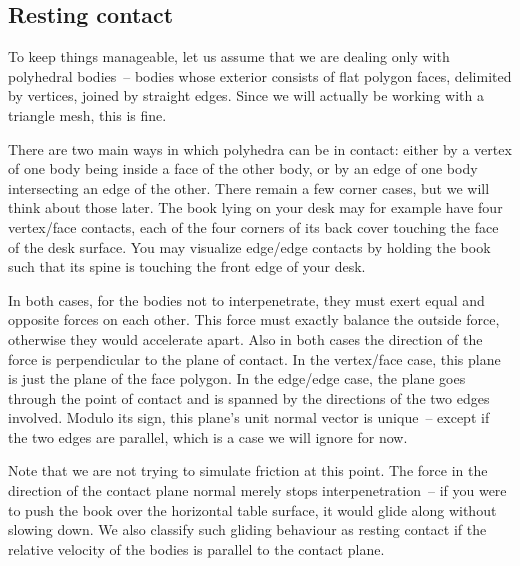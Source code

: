 \subsection{Resting contact\label{restingContact}}

To keep things manageable, let us assume that we are dealing only with polyhedral bodies~-- bodies
whose exterior consists of flat polygon faces, delimited by vertices, joined by straight edges.
Since we will actually be working with a triangle mesh, this is fine.

There are two main ways in which polyhedra can be in contact: either by a vertex of one body being
inside a face of the other body, or by an edge of one body intersecting an edge of the other.
There remain a few corner cases, but we will think about those later. The book lying on your desk
may for example have four vertex/face contacts, each of the four corners of its back cover
touching the face of the desk surface. You may visualize edge/edge contacts by holding the book
such that its spine is touching the front edge of your desk.

In both cases, for the bodies not to interpenetrate, they must exert equal and opposite forces on
each other. This force must exactly balance the outside force, otherwise they would accelerate
apart. Also in both cases the direction of the force is perpendicular to the plane of contact. In
the vertex/face case, this plane is just the plane of the face polygon. In the edge/edge case, the
plane goes through the point of contact and is spanned by the directions of the two edges involved.
Modulo its sign, this plane's unit normal vector is unique~-- except if the two edges are
parallel, which is a case we will ignore for now.

Note that we are not trying to simulate friction at this point. The force in the direction of the
contact plane normal merely stops interpenetration~-- if you were to push the book over the
horizontal table surface, it would glide along without slowing down. We also classify such gliding
behaviour as resting contact if the relative velocity of the bodies is parallel to the contact
plane.

